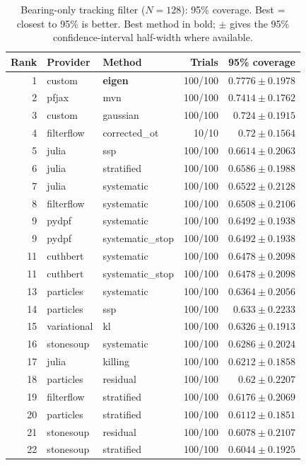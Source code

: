 \begin{table}[!htbp]
\centering
\small
\caption{Bearing-only tracking filter ($N=128$): 95\% coverage. Best = closest to 95\% is better. Best method in bold; $\pm$ gives the 95\% confidence-interval half-width where available.}
\label{tab:bearing-only-tracking-filter-coverage95}
\begin{tabular}{rllrr}
\toprule
Rank & Provider & Method & Trials & 95\% coverage \\
\midrule
1 & custom & \textbf{eigen} & 100/100 & $\mathbf{0.7776 \pm 0.1978}$ \\
2 & pfjax & mvn & 100/100 & $0.7414 \pm 0.1762$ \\
3 & custom & gaussian & 100/100 & $0.724 \pm 0.1915$ \\
4 & filterflow & corrected\_ot & 10/10 & $0.72 \pm 0.1564$ \\
5 & julia & ssp & 100/100 & $0.6614 \pm 0.2063$ \\
6 & julia & stratified & 100/100 & $0.6586 \pm 0.1988$ \\
7 & julia & systematic & 100/100 & $0.6522 \pm 0.2128$ \\
8 & filterflow & systematic & 100/100 & $0.6508 \pm 0.2106$ \\
9 & pydpf & systematic & 100/100 & $0.6492 \pm 0.1938$ \\
9 & pydpf & systematic\_stop & 100/100 & $0.6492 \pm 0.1938$ \\
11 & cuthbert & systematic & 100/100 & $0.6478 \pm 0.2098$ \\
11 & cuthbert & systematic\_stop & 100/100 & $0.6478 \pm 0.2098$ \\
13 & particles & systematic & 100/100 & $0.6364 \pm 0.2056$ \\
14 & particles & ssp & 100/100 & $0.633 \pm 0.2233$ \\
15 & variational & kl & 100/100 & $0.6326 \pm 0.1913$ \\
16 & stonesoup & systematic & 100/100 & $0.6286 \pm 0.2024$ \\
17 & julia & killing & 100/100 & $0.6212 \pm 0.1858$ \\
18 & particles & residual & 100/100 & $0.62 \pm 0.2207$ \\
19 & filterflow & stratified & 100/100 & $0.6176 \pm 0.2069$ \\
20 & particles & stratified & 100/100 & $0.6112 \pm 0.1851$ \\
21 & stonesoup & residual & 100/100 & $0.6078 \pm 0.2107$ \\
22 & stonesoup & stratified & 100/100 & $0.6044 \pm 0.1925$ \\

\end{tabular}
\end{table}
